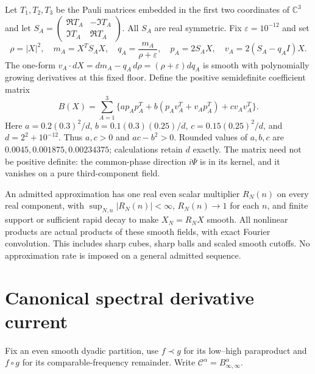 \documentclass[11pt]{article}
\newcommand{\C}{\mathbb C}
\newcommand{\eps}{\varepsilon}
\begin{document}
Let $T_1,T_2,T_3$ be the Pauli matrices embedded in the first two coordinates
of $\C^3$ and let
$S_A=\left(\begin{smallmatrix}\Re T_A&-\Im T_A\\\Im T_A&\Re T_A\end{smallmatrix}\right)$.
All $S_A$ are real symmetric. Fix $\eps=10^{-12}$ and set
\begin{equation}\label{eq:oneform}
 \rho=|X|^2,\quad m_A=X^TS_AX,\quad q_A=\frac{m_A}{\rho+\eps},
 \quad p_A=2S_AX,\quad v_A=2(S_A-q_AI)X.
\end{equation}
The one-form $v_A\cdot dX=dm_A-q_A\,d\rho=(\rho+\eps)dq_A$
is smooth with polynomially growing derivatives at this fixed floor.
Define the positive semidefinite coefficient matrix
\begin{equation}\label{eq:B}
 B(X)=\sum_{A=1}^3\{a p_Ap_A^T+b(p_Av_A^T+v_Ap_A^T)+c v_Av_A^T\}.
\end{equation}
Here $a=0.2(0.3)^2/d$, $b=0.1(0.3)(0.25)/d$,
$c=0.15(0.25)^2/d$, and $d=2^2+10^{-12}$.
Thus $a,c>0$ and $ac-b^2>0$. Rounded values of $a,b,c$ are
$0.0045,0.001875,0.00234375$; calculations retain $d$ exactly.
The matrix need not be positive definite: the common-phase direction
$i\Psi$ is in its kernel, and it vanishes on a pure third-component field.

An admitted approximation has one real even scalar multiplier $R_N(n)$
on every real component, with $\sup_{N,n}|R_N(n)|<\infty$,
$R_N(n)\to1$ for each $n$, and finite support or sufficient rapid decay
to make $X_N=R_NX$ smooth. All nonlinear products are actual products
of these smooth fields, with exact Fourier convolution. This includes
sharp cubes, sharp balls and scaled smooth cutoffs. No approximation rate
is imposed on a general admitted sequence.

\section{Canonical spectral derivative current}
Fix an even smooth dyadic partition, use $f\prec g$ for its low--high
paraproduct and $f\circ g$ for its comparable-frequency remainder.
Write $\mathcal C^\alpha=B^\alpha_{\infty,\infty}$.
\end{document}
